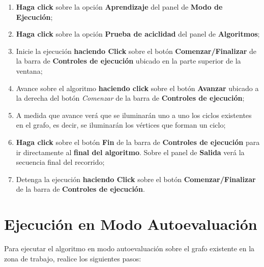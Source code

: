 \documentclass{book}
\begin{document}
\begin{enumerate}
	\itemsep=8pt \topsep=0pt \partopsep=0pt \parskip=0pt \parsep=0pt

	\item \textbf{Haga click} sobre la opción \textbf{Aprendizaje} del panel de \textbf{Modo de Ejecución};

	\item \textbf{Haga click} sobre la opción \textbf{Prueba de aciclidad} del panel de \textbf{Algoritmos};

	\item Inicie la ejecución \textbf{haciendo Click} sobre el botón \textbf{Comenzar/Finalizar} de la barra de \textbf{Controles de ejecución} ubicado en la parte superior de la ventana;

	\item Avance sobre el algoritmo \textbf{haciendo click} sobre el botón \textbf{Avanzar} ubicado a la derecha del botón \textit{Comenzar} de la barra de \textbf{Controles de ejecución};

	\item A medida que avance verá que se iluminarán uno a uno los ciclos existentes en el grafo, es decir, se iluminarán los vértices que forman un ciclo;

	\item \textbf{Haga click} sobre el botón \textbf{Fin} de la barra de \textbf{Controles de ejecución} para ir directamente al \textbf{final del algoritmo}. Sobre el panel de \textbf{Salida} verá la secuencia final del recorrido;

	\item Detenga la ejecución \textbf{haciendo Click} sobre el botón \textbf{Comenzar/Finalizar} de la barra de \textbf{Controles de ejecución}.

\end{enumerate}
\medskip



\section{Ejecución en Modo Autoevaluación}

Para ejecutar el algoritmo en modo autoevaluación sobre el grafo existente en la zona de trabajo, realice los siguientes pasos:
\medskip
\end{document}
